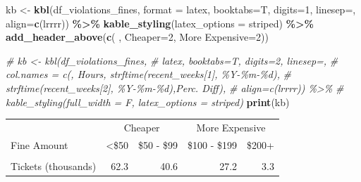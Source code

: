 \documentclass[
  paper=a4,
,captions=tableheading
]{scrartcl}
\newenvironment{Shaded}{\begin{snugshade}}{\end{snugshade}}
\newcommand{\CommentTok}[1]{\textcolor[rgb]{0.56,0.35,0.01}{\textit{#1}}}
\newcommand{\DataTypeTok}[1]{\textcolor[rgb]{0.13,0.29,0.53}{#1}}
\newcommand{\DecValTok}[1]{\textcolor[rgb]{0.00,0.00,0.81}{#1}}
\newcommand{\KeywordTok}[1]{\textcolor[rgb]{0.13,0.29,0.53}{\textbf{#1}}}
\newcommand{\NormalTok}[1]{#1}
\newcommand{\OperatorTok}[1]{\textcolor[rgb]{0.81,0.36,0.00}{\textbf{#1}}}
\newcommand{\StringTok}[1]{\textcolor[rgb]{0.31,0.60,0.02}{#1}}
\begin{document}
\begin{Shaded}
\begin{Highlighting}[]
\NormalTok{kb \textless{}{-}}\StringTok{ }\KeywordTok{kbl}\NormalTok{(df\_violations\_fines, }\DataTypeTok{format =} \StringTok{\textquotesingle{}latex\textquotesingle{}}\NormalTok{,}
          \DataTypeTok{booktabs=}\NormalTok{T, }\DataTypeTok{digits=}\DecValTok{1}\NormalTok{, }\DataTypeTok{linesep=}\StringTok{\textquotesingle{}\textquotesingle{}}\NormalTok{, }\DataTypeTok{align=}\KeywordTok{c}\NormalTok{(}\StringTok{\textquotesingle{}lrrrr\textquotesingle{}}\NormalTok{)) }\OperatorTok{\%\textgreater{}\%}
\StringTok{  }\KeywordTok{kable\_styling}\NormalTok{(}\DataTypeTok{latex\_options =} \StringTok{\textquotesingle{}striped\textquotesingle{}}\NormalTok{) }\OperatorTok{\%\textgreater{}\%}
\StringTok{  }\KeywordTok{add\_header\_above}\NormalTok{(}\KeywordTok{c}\NormalTok{(}\StringTok{\textquotesingle{} \textquotesingle{}}\NormalTok{, }\StringTok{\textquotesingle{}Cheaper\textquotesingle{}}\NormalTok{=}\DecValTok{2}\NormalTok{, }\StringTok{\textquotesingle{}More Expensive\textquotesingle{}}\NormalTok{=}\DecValTok{2}\NormalTok{))}

\CommentTok{\# kb \textless{}{-} kbl(df\_violations\_fines,}
\CommentTok{\#             \textquotesingle{}latex\textquotesingle{}, booktabs=T, digits=2, linesep=\textquotesingle{}\textquotesingle{},}
\CommentTok{\#             col.names = c(\textquotesingle{}\textquotesingle{}, \textquotesingle{}Hours\textquotesingle{}, strftime(recent\_weeks[1], \textquotesingle{}\%Y{-}\%m{-}\%d\textquotesingle{}),}
\CommentTok{\#                           strftime(recent\_weeks[2], \textquotesingle{}\%Y{-}\%m{-}\%d\textquotesingle{}),\textquotesingle{}Perc. Diff\textquotesingle{}),}
\CommentTok{\#             align=c(\textquotesingle{}lrrrr\textquotesingle{})) \%\textgreater{}\%}
\CommentTok{\#   kable\_styling(full\_width = F, latex\_options = \textquotesingle{}striped\textquotesingle{})}
\KeywordTok{print}\NormalTok{(kb)}
\end{Highlighting}
\end{Shaded}

\begin{table}[H]
\centering
\begin{tabular}[t]{lrrrr}
\toprule
\multicolumn{1}{c}{ } & \multicolumn{2}{c}{Cheaper} & \multicolumn{2}{c}{More Expensive} \\
\cmidrule(l{3pt}r{3pt}){2-3} \cmidrule(l{3pt}r{3pt}){4-5}
Fine Amount & <\$50 & \$50 - \$99 & \$100 - \$199 & \$200+\\
\midrule
\cellcolor{gray!6}{Percent Paid} & \cellcolor{gray!6}{\%30.7} & \cellcolor{gray!6}{\%22.7} & \cellcolor{gray!6}{\%19.3} & \cellcolor{gray!6}{\%10.3}\\
Tickets (thousands) & 62.3 & 40.6 & 27.2 & 3.3\\
\bottomrule
\end{tabular}
\end{table}
\end{document}
